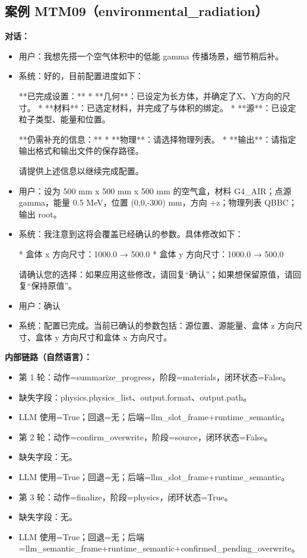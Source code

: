 \documentclass[11pt]{ctexart}
\begin{document}
\subsection{案例 MTM09（environmental\_radiation）}
\textbf{对话：}
\begin{itemize}
\item 用户：我想先搭一个空气体积中的低能 gamma 传播场景，细节稍后补。
\item 系统：好的，目前配置进度如下：

**已完成设置：**
*   **几何**：已设定为长方体，并确定了X、Y方向的尺寸。
*   **材料**：已选定材料，并完成了与体积的绑定。
*   **源**：已设定粒子类型、能量和位置。

**仍需补充的信息：**
*   **物理**：请选择物理列表。
*   **输出**：请指定输出格式和输出文件的保存路径。

请提供上述信息以继续完成配置。
\item 用户：设为 500 mm x 500 mm x 500 mm 的空气盒，材料 G4\_AIR；点源 gamma，能量 0.5 MeV，位置 (0,0,-300) mm，方向 +z；物理列表 QBBC；输出 root。
\item 系统：我注意到这将会覆盖已经确认的参数。具体修改如下：

*   盒体 x 方向尺寸：1000.0 → 500.0
*   盒体 y 方向尺寸：1000.0 → 500.0

请确认您的选择：如果应用这些修改，请回复“确认”；如果想保留原值，请回复“保持原值”。
\item 用户：确认
\item 系统：配置已完成。当前已确认的参数包括：源位置、源能量、盒体 z 方向尺寸、盒体 y 方向尺寸和盒体 x 方向尺寸。
\end{itemize}
\textbf{内部链路（自然语言）：}
\begin{itemize}
\item 第 1 轮：动作=summarize\_progress，阶段=materials，闭环状态=False。
\item 缺失字段：physics.physics\_list、output.format、output.path。
\item LLM 使用=True；回退=无；后端=llm\_slot\_frame+runtime\_semantic。
\item 第 2 轮：动作=confirm\_overwrite，阶段=source，闭环状态=False。
\item 缺失字段：无。
\item LLM 使用=True；回退=无；后端=llm\_slot\_frame+runtime\_semantic。
\item 第 3 轮：动作=finalize，阶段=physics，闭环状态=True。
\item 缺失字段：无。
\item LLM 使用=True；回退=无；后端=llm\_semantic\_frame+runtime\_semantic+confirmed\_pending\_overwrite。
\end{itemize}
\end{document}
